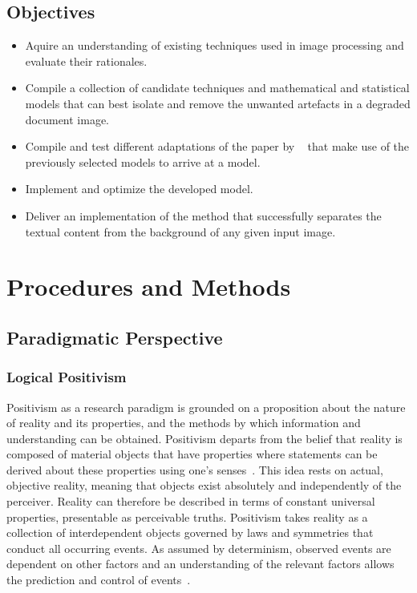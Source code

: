 \documentclass[a4paper, 12pt]{report}
\begin{document}
\subsection{Objectives}
\begin{itemize}
    \item Aquire an understanding of existing techniques used in image processing and
          evaluate their rationales.
    \item Compile a collection of candidate techniques and mathematical and statistical
          models that can best isolate and remove the unwanted artefacts in a degraded
          document image.
    \item Compile and test different adaptations of the paper by ~\cite{su2012robust}
          that make use of the previously selected models to arrive at a model.
    \item Implement and optimize the developed model.
    \item Deliver an implementation of the method that successfully separates the textual
          content from the background of any given input image.
\end{itemize}

\newpage

\section{Procedures and Methods}
\subsection{Paradigmatic Perspective}
\subsubsection{Logical Positivism}
Positivism as a research paradigm is grounded on a proposition about the nature
of reality and its properties, and the methods by which information and
understanding can be obtained. Positivism departs from the belief that reality
is composed of material objects that have properties where statements can be
derived about these properties using one’s senses~\cite{putnam2012philosophy}.
This idea rests on actual, objective reality, meaning that objects exist
absolutely and independently of the perceiver. Reality can therefore be
described in terms of constant universal properties, presentable as perceivable
truths. Positivism takes reality as a collection of interdependent objects
governed by laws and symmetries that conduct all occurring events. As assumed
by determinism, observed events are dependent on other factors and an
understanding of the relevant factors allows the prediction and control of
events~\cite{kivunja2017understanding}.\par
\end{document}
